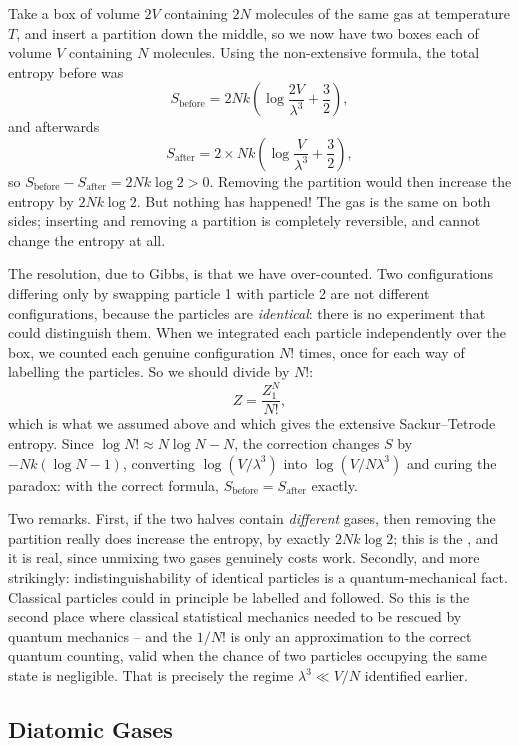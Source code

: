 \documentclass[a4paper]{scrartcl}
\begin{document}
\begin{example}
	Take a box of volume $2V$ containing $2N$ molecules of the same gas at temperature $T$, and insert a partition down the middle, so we now have two boxes each of volume $V$ containing $N$ molecules. Using the non-extensive formula, the total entropy before was
	$$
	S_{\mathrm{before}} = 2Nk\left(\log\frac{2V}{\lambda^3} + \frac 32\right),
	$$
	and afterwards
	$$
	S_{\mathrm{after}} = 2 \times Nk\left(\log\frac{V}{\lambda^3} + \frac 32\right),
	$$
	so $S_{\mathrm{before}} - S_{\mathrm{after}} = 2Nk\log 2 > 0$. Removing the partition would then increase the entropy by $2Nk\log 2$. But nothing has happened! The gas is the same on both sides; inserting and removing a partition is completely reversible, and cannot change the entropy at all.
\end{example}

The resolution, due to Gibbs, is that we have over-counted. Two configurations differing only by swapping particle 1 with particle 2 are not different configurations, because the particles are \emph{identical}: there is no experiment that could distinguish them. When we integrated each particle independently over the box, we counted each genuine configuration $N!$ times, once for each way of labelling the particles. So we should divide by $N!$:
$$
Z = \frac{Z_1^N}{N!},
$$
which is what we assumed above and which gives the extensive Sackur--Tetrode entropy. Since $\log N! \approx N\log N - N$, the correction changes $S$ by $-Nk(\log N - 1)$, converting $\log(V/\lambda^3)$ into $\log(V/N\lambda^3)$ and curing the paradox: with the correct formula, $S_{\mathrm{before}} = S_{\mathrm{after}}$ exactly.

Two remarks. First, if the two halves contain \emph{different} gases, then removing the partition really does increase the entropy, by exactly $2Nk\log 2$; this is the , and it is real, since unmixing two gases genuinely costs work. Secondly, and more strikingly: indistinguishability of identical particles is a quantum-mechanical fact. Classical particles could in principle be labelled and followed. So this is the second place where classical statistical mechanics needed to be rescued by quantum mechanics -- and the $1/N!$ is only an approximation to the correct quantum counting, valid when the chance of two particles occupying the same state is negligible. That is precisely the regime $\lambda^3 \ll V/N$ identified earlier.

\subsection{Diatomic Gases}
\end{document}
